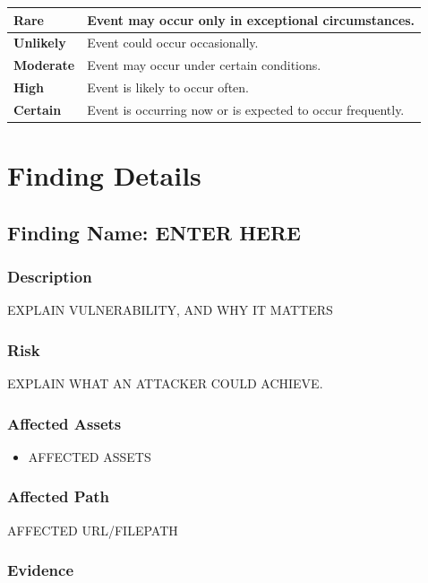 \documentclass[12pt]{article}
\begin{document}
\begin{longtable}{|p{3cm}|p{12cm}|}
\hline
\textbf{\textcolor{rare}{Rare}} & Event may occur only in exceptional circumstances. \\ \hline
\textbf{\textcolor{unlikely}{Unlikely}} & Event could occur occasionally. \\ \hline
\textbf{\textcolor{moderate}{Moderate}} & \textcolor{moderate}{Event may occur under certain conditions.} \\ \hline
\textbf{\textcolor{high}{High}} & Event is likely to occur often. \\ \hline
\textbf{\textcolor{certain}{Certain}} & Event is occurring now or is expected to occur frequently. \\ \hline
\end{longtable}

\section*{Finding Details}

\subsection*{Finding Name: ENTER HERE}

\subsubsection*{Description}
EXPLAIN VULNERABILITY, AND WHY IT MATTERS

\subsubsection*{Risk}
EXPLAIN WHAT AN ATTACKER COULD ACHIEVE.

\subsubsection*{Affected Assets}
\begin{itemize}
    \item AFFECTED ASSETS
\end{itemize}

\subsubsection*{Affected Path}
AFFECTED URL/FILEPATH

\subsubsection*{Evidence}
\end{document}
